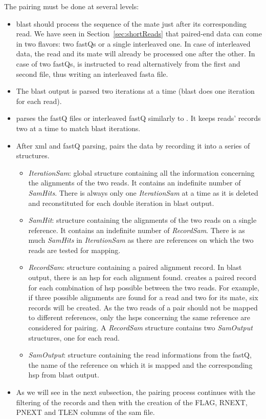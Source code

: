 The pairing must be done at several levels:
\begin{itemize}
    \item \gls{blast} should process the sequence of the mate just after its corresponding read.
    We have seen in Section~\ref{sec:shortReads} that paired-end data can come in two flavors: two fastQs or a single interleaved one.
    In case of interleaved data, the read and its mate will already be processed one after the other.
    In case of two fastQs, \fastqtofasta{} is instructed to read alternatively from the first and second file, thus writing an interleaved fasta file.
    \item The \gls{blast} output is parsed two iterations at a time (\gls{blast} does one iteration for each read).
    \item \blastobam{} parses the fastQ files or interleaved fastQ similarly to \fastqtofasta{}.
    It keeps reads' records two at a time to match \gls{blast} iterations.
    \item After \gls{xml} and fastQ parsing, \blastobam{} pairs the data by recording it into a series of structures.
    \begin{itemize}
        \item \emph{IterationSam}: global structure containing all the information concerning the alignments of the two reads. It contains an indefinite number of \emph{SamHits}.
        There is always only one \emph{IterationSam} at a time as it is deleted and reconstituted for each double iteration in \gls{blast} output.
        \item \emph{SamHit}: structure containing the alignments of the two reads on a single reference. It contains an indefinite number of \emph{RecordSam}.
        There is as much \emph{SamHits} in \emph{IterationSam} as there are references on which the two reads are tested for mapping.
        \item \emph{RecordSam}: structure containing a paired alignment record. In \gls{blast} output, there is an \gls{hsp} for each alignment found.
        \blastobam{} creates a paired record for each combination of \gls{hsp} possible between the two reads.
        For example, if three possible alignments are found for a read and two for its mate, six records will be created.
        As the two reads of a pair should not be mapped to different references, only the \glspl{hsp} concerning the same reference are considered for pairing.
        A \emph{RecordSam} structure contains two \emph{SamOutput} structures, one for each read.
        \item \emph{SamOutput}: structure containing the read informations from the fastQ, the name of the reference on which it is mapped and the corresponding \gls{hsp} from \gls{blast} output.
    \end{itemize}
    \item As we will see in the next subsection, the pairing process continues with the filtering of the records and then with the creation of the FLAG, RNEXT, PNEXT and TLEN columns of the \gls{sam} file.
\end{itemize}


